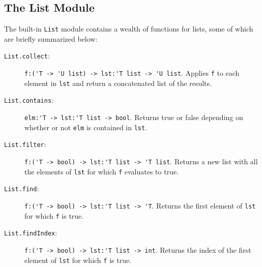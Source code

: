 \documentclass[fsharpnotes.tex]{subfiles}
\begin{document}
\subsection{The List Module}
The built-in \lstinline{List} module contains a wealth of functions for lists, some of which are
briefly summarized below:
\begin{description}
\item[\texttt{List.collect}:] \lstinline{f:('T -> 'U list) -> lst:'T list -> 'U list}. Applies \lstinline{f} to each element in \lstinline{lst} and return a concatenated list of the results.
\item[\texttt{List.contains}:] \lstinline{elm:'T -> lst:'T list -> bool}. Returns true or false depending on whether or not \lstinline{elm} is contained in \lstinline{lst}.
\item[\texttt{List.filter}:] \lstinline{f:('T -> bool) -> lst:'T list -> 'T list}. Returns a new list with all the elements of \lstinline{lst} for which \lstinline{f} evaluates to true.
\item[\texttt{List.find}:] \lstinline{f:('T -> bool) -> lst:'T list -> 'T}. Returns the first element of \lstinline{lst} for which \lstinline{f} is true.
\item[\texttt{List.findIndex}:] \lstinline{f:('T -> bool) -> lst:'T list -> int}. Returns the index of the first element of \lstinline{lst} for which \lstinline{f} is true.

\end{description}
\end{document}

